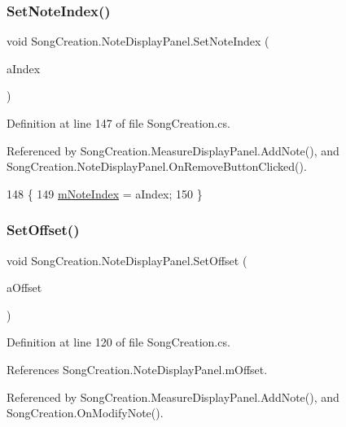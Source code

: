 \subsubsection{\texorpdfstring{Set\+Note\+Index()}{SetNoteIndex()}}
{\footnotesize\ttfamily void Song\+Creation.\+Note\+Display\+Panel.\+Set\+Note\+Index (\begin{DoxyParamCaption}\item[{int}]{a\+Index }\end{DoxyParamCaption})}



Definition at line 147 of file Song\+Creation.\+cs.



Referenced by Song\+Creation.\+Measure\+Display\+Panel.\+Add\+Note(), and Song\+Creation.\+Note\+Display\+Panel.\+On\+Remove\+Button\+Clicked().


\begin{DoxyCode}
148         \{
149             \hyperlink{class_song_creation_1_1_note_display_panel_a383f4e592812c12028e0ff3f7aec0980}{mNoteIndex} = aIndex;
150         \}
\end{DoxyCode}
\mbox{\label{class_song_creation_1_1_note_display_panel_aeeaa559c542f89fcecc4fc46df83fa06}} 
\subsubsection{\texorpdfstring{Set\+Offset()}{SetOffset()}}
{\footnotesize\ttfamily void Song\+Creation.\+Note\+Display\+Panel.\+Set\+Offset (\begin{DoxyParamCaption}\item[{\hyperlink{group___music_enums_gaf11b5f079adbb21c800b9eca1c5c3cbd}{Music.\+N\+O\+T\+E\+\_\+\+L\+E\+N\+G\+TH}}]{a\+Offset }\end{DoxyParamCaption})}



Definition at line 120 of file Song\+Creation.\+cs.



References Song\+Creation.\+Note\+Display\+Panel.\+m\+Offset.



Referenced by Song\+Creation.\+Measure\+Display\+Panel.\+Add\+Note(), and Song\+Creation.\+On\+Modify\+Note().


